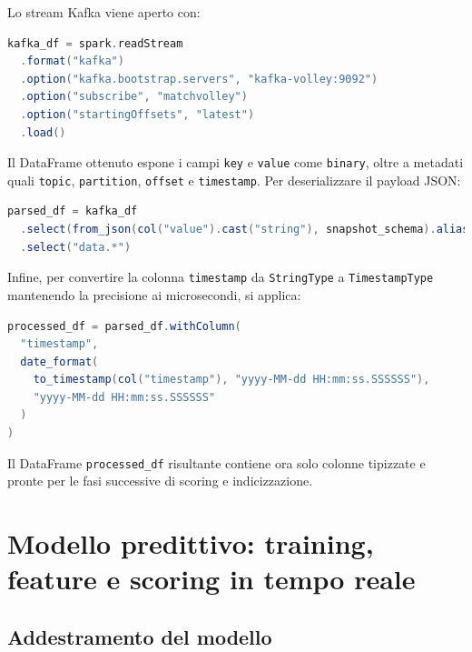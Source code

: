 \documentclass[a4paper,12pt]{report}
\begin{document}
Lo stream Kafka viene aperto con:

\begin{lstlisting}[language=Scala]
kafka_df = spark.readStream
  .format("kafka")
  .option("kafka.bootstrap.servers", "kafka-volley:9092")
  .option("subscribe", "matchvolley")
  .option("startingOffsets", "latest")
  .load()
\end{lstlisting}

Il DataFrame ottenuto espone i campi \texttt{key} e \texttt{value} come \texttt{binary}, oltre a metadati quali \texttt{topic}, \texttt{partition}, \texttt{offset} e \texttt{timestamp}. Per deserializzare il payload JSON:

\begin{lstlisting}[language=Scala]
parsed_df = kafka_df
  .select(from_json(col("value").cast("string"), snapshot_schema).alias("data"))
  .select("data.*")
\end{lstlisting}

\newpage
Infine, per convertire la colonna \texttt{timestamp} da \texttt{StringType} a \texttt{TimestampType} mantenendo la precisione ai microsecondi, si applica:

\begin{lstlisting}[language=Scala]
processed_df = parsed_df.withColumn(
  "timestamp",
  date_format(
    to_timestamp(col("timestamp"), "yyyy-MM-dd HH:mm:ss.SSSSSS"),
    "yyyy-MM-dd HH:mm:ss.SSSSSS"
  )
)
\end{lstlisting}

Il DataFrame \texttt{processed\_df} risultante contiene ora solo colonne tipizzate e pronte per le fasi successive di scoring e indicizzazione.


\section{Modello predittivo: training, feature e scoring in tempo reale}

\subsection{Addestramento del modello}
\end{document}
